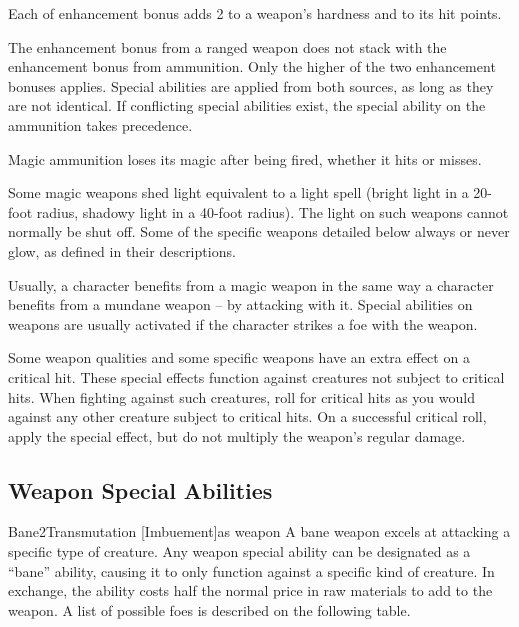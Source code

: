          Each  of enhancement bonus adds 2 to a weapon's hardness and  to its hit points.

         The enhancement bonus from a ranged weapon does not stack with the enhancement bonus from ammunition.
        Only the higher of the two enhancement bonuses applies.
        Special abilities are applied from both sources, as long as they are not identical.
        If conflicting special abilities exist, the special ability on the ammunition takes precedence.

        Magic ammunition loses its magic after being fired, whether it hits or misses.

         Some magic weapons shed light equivalent to a light spell (bright light in a 20-foot radius, shadowy light in a 40-foot radius).
        The light on such weapons cannot normally be shut off.
        Some of the specific weapons detailed below always or never glow, as defined in their descriptions.

         Usually, a character benefits from a magic weapon in the same way a character benefits from a mundane weapon -- by attacking with it.
        Special abilities on weapons are usually activated if the character strikes a foe with the weapon.

         Some weapon qualities and some specific weapons have an extra effect on a critical hit.
        These special effects function against creatures not subject to critical hits.
        When fighting against such creatures, roll for critical hits as you would against any other creature subject to critical hits.
        On a successful critical roll, apply the special effect, but do not multiply the weapon's regular damage.

    \subsection{Weapon Special Abilities}\label{Weapon Special Abilities}

        \begin{magicitemdef}{Bane}{2}{Transmutation [Imbuement]}{as weapon}
            \spellspecial A bane weapon excels at attacking a specific type of creature.
            Any weapon special ability can be designated as a ``bane'' ability, causing it to only function against a specific kind of creature.
            In exchange, the ability costs half the normal price in raw materials to add to the weapon.
            A list of possible foes is described on the following table.
        \end{magicitemdef}

